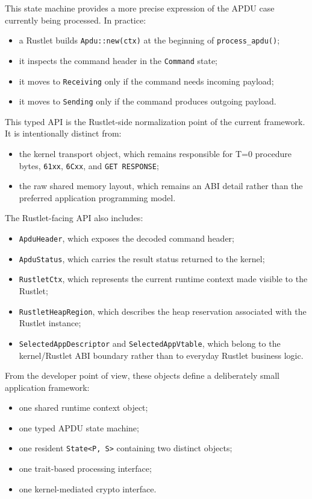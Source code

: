 This state machine provides a more precise expression of the APDU case
currently being processed. In practice:
\begin{itemize}
\item a Rustlet builds \texttt{Apdu::new(ctx)} at the beginning of
  \texttt{process\_apdu()};
\item it inspects the command header in the \texttt{Command} state;
\item it moves to \texttt{Receiving} only if the command needs incoming
  payload;
\item it moves to \texttt{Sending} only if the command produces outgoing
  payload.
\end{itemize}

This typed API is the Rustlet-side normalization point of the current
framework. It is intentionally distinct from:
\begin{itemize}
\item the kernel transport object, which remains responsible for T=0
  procedure bytes, \texttt{61xx}, \texttt{6Cxx}, and \texttt{GET
  RESPONSE};
\item the raw shared memory layout, which remains an ABI detail rather
  than the preferred application programming model.
\end{itemize}

The Rustlet-facing API also includes:
\begin{itemize}
\item \texttt{ApduHeader}, which exposes the decoded command header;
\item \texttt{ApduStatus}, which carries the result status returned to
  the kernel;
\item \texttt{RustletCtx}, which represents the current runtime context
  made visible to the Rustlet;
\item \texttt{RustletHeapRegion}, which describes the heap reservation
  associated with the Rustlet instance;
\item \texttt{SelectedAppDescriptor} and \texttt{SelectedAppVtable},
  which belong to the kernel/Rustlet ABI boundary rather than to
  everyday Rustlet business logic.
\end{itemize}

From the developer point of view, these objects define a deliberately
small application framework:
\begin{itemize}
\item one shared runtime context object;
\item one typed APDU state machine;
\item one resident \texttt{State<P, S>} containing two distinct objects;
\item one trait-based processing interface;
\item one kernel-mediated crypto interface.
\end{itemize}

